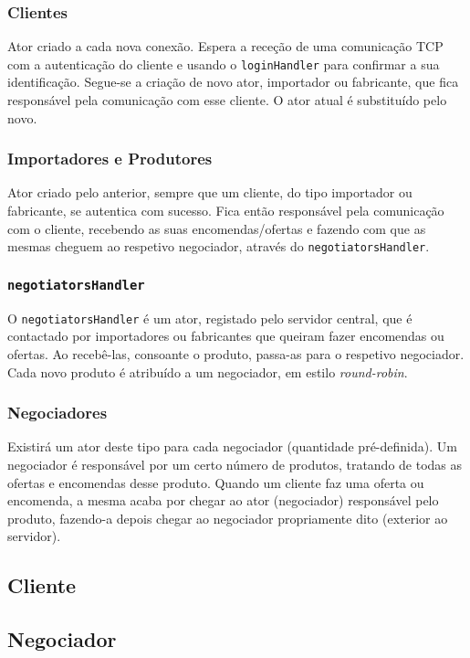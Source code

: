 \documentclass[a4paper]{report}
\begin{document}
	\subsubsection{Clientes}
	Ator criado a cada nova conexão. Espera a receção de uma comunicação TCP com a autenticação do cliente e usando o \texttt{loginHandler} para confirmar a sua identificação.
	Segue-se a criação de novo ator, importador ou fabricante, que fica responsável pela comunicação com esse cliente. O ator atual é substituído pelo novo.

	\subsubsection{Importadores e Produtores}
	Ator criado pelo anterior, sempre que um cliente, do tipo importador ou fabricante, se autentica com sucesso. 
	Fica então responsável pela comunicação com o cliente, recebendo as suas encomendas/ofertas e fazendo com que as mesmas cheguem ao respetivo negociador, através do \texttt{negotiatorsHandler}.

	\subsubsection{\texttt{negotiatorsHandler}}
	O \texttt{negotiatorsHandler} é um ator, registado pelo servidor central, que é contactado por importadores ou fabricantes que queiram fazer encomendas ou ofertas. 
	Ao recebê-las, consoante o produto, passa-as para o respetivo negociador. Cada novo produto é atribuído a um negociador, em estilo \textit{round-robin}.

	\subsubsection{Negociadores}
	Existirá um ator deste tipo para cada negociador (quantidade pré-definida). Um negociador é responsável por um certo número de produtos, tratando de todas as ofertas e encomendas desse produto.
	Quando um cliente faz uma oferta ou encomenda, a mesma acaba por chegar ao ator (negociador) responsável pelo produto, fazendo-a depois chegar ao negociador propriamente dito (exterior ao servidor).


	\subsection{Cliente}


	\subsection{Negociador}
\end{document}
